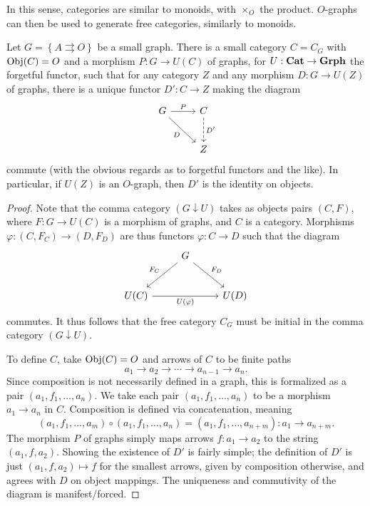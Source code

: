 In this sense, categories are similar to monoids, with $\times _O$ the product. $O$-graphs can then be used to generate free categories, similarly to monoids.

\begin{theorem}\label{thm:2.2}
	Let $G=\left\{ A\rightrightarrows O \right\} $ be a small graph. There is a small category $C=C_G$ with $\operatorname{Obj}(C) =O$ and a morphism $P : G \to U(C)$ of graphs, for $U : \mathbf{Cat}  \to \mathbf{Grph} $ the forgetful functor, such that for any category $Z$ and any morphism $D : G \to U(Z)$ of graphs, there is a unique functor $D': C \to Z$ making the diagram
	\[\begin{tikzcd}[row sep = 2.5em, column sep = 2.5em]
	G\ar[" P ", r] \ar[" D "', dr]  & C\ar[" D' ", dashed, d]  \\
	 & Z
	\end{tikzcd}\]
	commute (with the obvious regards as to forgetful functors and the like). In particular, if $U(Z)$ is an $O$-graph, then $D'$ is the identity on objects.
\end{theorem}
\begin{proof}
	Note that the comma category $(G\downarrow U)$ takes as objects pairs $(C,F)$, where $F : G \to U(C)$ is a morphism of graphs, and $C$ is a category. Morphisms $\varphi : (C,F_C) \to (D,F_D)$ are thus functors $\varphi : C \to D$ such that the diagram
	\[\begin{tikzcd}[row sep = 2.5em, column sep = 2.5em]
	 & G\ar[" F_C "', dl] \ar[" F_D ", dr]  &  \\
	U(C)\ar[" U(\varphi ) "', rr]  &  & U(D)
	\end{tikzcd}\]
	commutes. It thus follows that the free category $C_G$ must be initial in the comma category $(G\downarrow U)$.

To define $C$, take $\operatorname{Obj}(C) =O$ and arrows of $C$ to be finite paths
\[
	a_1 \to a_2 \to \cdots \to a_{n-1} \to a_n
.\]
Since composition is not necessarily defined in a graph, this is formalized as a pair $(a_1,f_1, \ldots ,a_n)$. We take each pair $(a_1,f_1, \ldots ,a_n)$ to be a morphism $a_1\to a_n$ in $C$. Composition is defined via concatenation, meaning
\[
	(a_1,f_1, \ldots ,a_m)\circ (a_1,f_1, \ldots ,a_n)=(a_1,f_1, \ldots ,a_{n+m}): a_1 \to a_{n+m} 
.\]
The morphism $P$ of graphs simply maps arrows $f : a_1 \to a_2$ to the string $(a_1,f,a_2)$. Showing the existence of $D'$ is fairly simple; the definition of $D'$ is just $(a_1,f,a_2)\mapsto f$ for the smallest arrows, given by composition otherwise, and agrees with $D$ on object mappings. The uniqueness and commutivity of the diagram is manifest/forced.
\end{proof}

